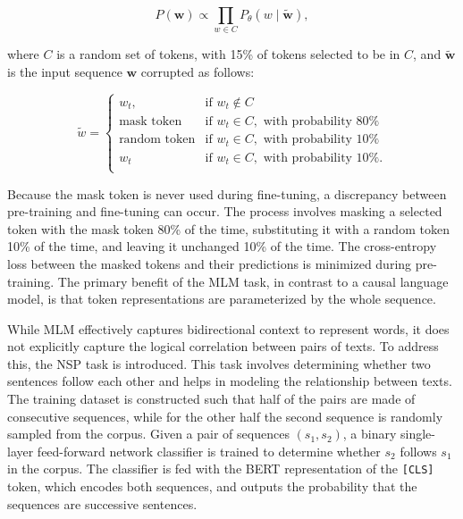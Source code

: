 \begin{equation}
    P(\bm{w}) \propto \prod_{w \in C} P_{\theta} \left(w \mid \tilde{\bm{w}}\right),
\end{equation}

\noindent where $C$ is a random set of tokens, with 15\% of tokens selected to be in $C$, and $\tilde{\bm{w}}$ is the input sequence $\bm{w}$ corrupted as follows:

\begin{equation}
    \tilde{w} = 
\begin{cases}
    w_t,               & \text{if } w_t \notin C\\
    \text{mask token}       & \text{if } w_t \in C, \text{ with probability 80\%} \\
    \text{random token}       & \text{if } w_t \in C, \text{ with probability 10\%} \\
    w_t       & \text{if } w_t \in C, \text{ with probability 10\%.} \\
\end{cases}
\end{equation}

\noindent Because the mask token is never used during fine-tuning, a discrepancy between pre-training and fine-tuning can occur. The process involves masking a selected token with the mask token 80\% of the time, substituting it with a random token 10\% of the time, and leaving it unchanged 10\% of the time. The cross-entropy loss between the masked tokens and their predictions is minimized during pre-training. The primary benefit of the \ac{MLM} task, in contrast to a causal language model, is that token representations are parameterized by the whole sequence.

While \ac{MLM} effectively captures bidirectional context to represent words, it does not explicitly capture the logical correlation between pairs of texts. To address this, the \ac{NSP} task is introduced. This task involves determining whether two sentences follow each other and helps in modeling the relationship between texts. The training dataset is constructed such that half of the pairs are made of consecutive sequences, while for the other half the second sequence is randomly sampled from the corpus. Given a pair of sequences $(s_1, s_2)$, a binary single-layer feed-forward network classifier is trained to determine whether $s_2$ follows $s_1$ in the corpus. The classifier is fed with the \ac{BERT} representation of the \texttt{[CLS]} token, which encodes both sequences, and outputs the probability that the sequences are successive sentences. 


